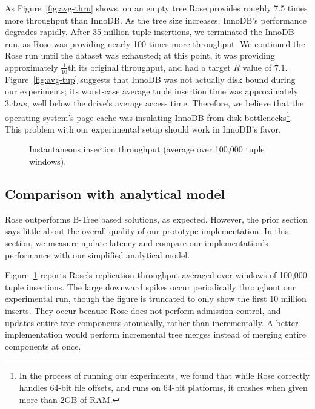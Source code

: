 \documentclass{vldb}
\newcommand{\rows}{Rose\xspace}
\newcommand{\rowss}{Rose's\xspace}
\begin{document}
As Figure~\ref{fig:avg-thru} shows, on an empty tree \rows provides
roughly 7.5 times more throughput than InnoDB.  As the tree size
increases, InnoDB's performance degrades rapidly.  After 35 million
tuple insertions, we terminated the InnoDB run, as \rows was providing
nearly 100 times more throughput.  We continued the \rows run until
the dataset was exhausted; at this point, it was providing
approximately $\frac{1}{10}$th its original throughput, and had a
target $R$ value of $7.1$.  Figure~\ref{fig:avg-tup} suggests that
InnoDB was not actually disk bound during our experiments; its
worst-case average tuple insertion time was approximately $3.4 ms$;
well below the drive's average access time.  Therefore, we believe
that the operating system's page cache was insulating InnoDB from disk
bottlenecks\footnote{In the process of running our experiments, we
  found that while \rows correctly handles 64-bit file offsets, and
  runs on 64-bit platforms, it crashes when given more than 2GB of
  RAM.}.  This problem with our experimental setup should work in InnoDB's favor.
\begin{figure}
\centering
{}
\caption{Instantaneous insertion throughput (average over 100,000 tuple windows).}
\label{fig:inst-thru}
\end{figure}


\subsection{Comparison with analytical model}

\rows outperforms B-Tree based solutions, as expected.  However, the
prior section says little about the overall quality of our prototype
implementation.  In this section, we measure update latency and compare
our implementation's performance with our simplified analytical model.

Figure~\ref{fig:inst-thru} reports \rowss replication throughput
averaged over windows of 100,000 tuple insertions.  The large downward
spikes occur periodically throughout our experimental run, though the
figure is truncated to only show the first 10 million inserts.  They
occur because \rows does not perform admission control, and updates
entire tree components atomically, rather than incrementally.
A better implementation would perform
incremental tree merges instead of merging entire components at once.
\end{document}
